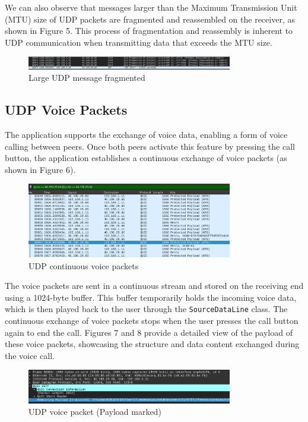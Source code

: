 \documentclass{article}
\begin{document}
\newpage We can also observe that messages larger than the Maximum Transmission Unit (MTU) size of UDP packets are fragmented and reassembled on the receiver, as shown in Figure 5. This process of fragmentation and reassembly is inherent to UDP communication when transmitting data that exceeds the MTU size.


\begin{figure}[h!]
    \centering
    \includegraphics[width=0.8\textwidth]{udp-messages-fragmented.png}
    \caption{Large UDP message fragmented}
    \label{fig:udp-messages-4}
\end{figure}

\subsection{UDP Voice Packets}

The application supports the exchange of voice data, enabling a form of voice calling between peers. Once both peers activate this feature by pressing the call button, the application establishes a continuous exchange of voice packets (as shown in Figure 6).

\begin{figure}[h!]
    \centering
    \includegraphics[width=0.8\textwidth]{udp-voice-1.png}
    \caption{UDP continuous voice packets}
    \label{fig:udp-voice-1}
\end{figure}

The voice packets are sent in a continuous stream and stored on the receiving end using a 1024-byte buffer. This buffer temporarily holds the incoming voice data, which is then played back to the user through the \texttt{SourceDataLine} class. The continuous exchange of voice packets stops when the user presses the call button again to end the call. Figures 7 and 8 provide a detailed view of the payload of these voice packets, showcasing the structure and data content exchanged during the voice call.

\begin{figure}[h!]
    \centering
    \includegraphics[width=0.8\textwidth]{udp-voice-2.png}
    \caption{UDP voice packet (Payload marked)}
    \label{fig:udp-voice-2}
\end{figure}
\end{document}
